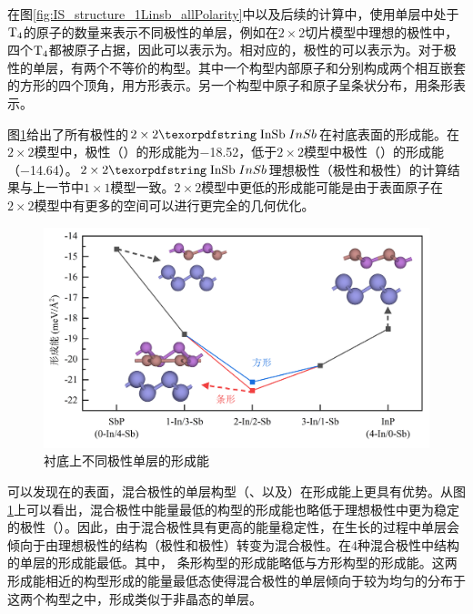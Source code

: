 在图\ref{fig:IS_structure_1Linsb_allPolarity}中以及后续的计算中，使用单层中处于$\rm T_{4} \it$的原子的数量来表示不同极性的单层，例如在$2 \times 2$切片模型中理想的极性中，四个$\rm T_{4} \it$都被原子占据，因此可以表示为。相对应的，极性的可以表示为。对于极性的单层，有两个不等价的构型。其中一个构型内部原子和分别构成两个相互嵌套的方形的四个顶角，用方形表示。另一个构型中原子和原子呈条状分布，用条形表示。

图\ref{fig:IS_DFT_1LInSb_all}给出了所有极性的$2 \times 2 \cemb{InSb}$在衬底表面的形成能。在$2 \times 2$模型中，极性（）的形成能为\SI{-18.52}{\mievpas}，低于$2 \times 2$模型中极性（）的形成能（\SI{-14.64}{\mievpas}）。$2 \times 2 \cemb{InSb}$理想极性（极性和极性）的计算结果与上一节中$1 \times 1$模型一致。$2 \times 2$模型中更低的形成能可能是由于表面原子在$2 \times 2$模型中有更多的空间可以进行更完全的几何优化。

\begin{figure}[!b]
    \includegraphics{pic/IS_DFT_1LInSb_all.png}
    \caption{衬底上不同极性单层的形成能}
    \label{fig:IS_DFT_1LInSb_all}
\end{figure}

可以发现在的表面，混合极性的单层构型（、以及）在形成能上更具有优势。从图\ref{fig:IS_DFT_1LInSb_all}上可以看出，混合极性中能量最低的构型的形成能也略低于理想极性中更为稳定的极性（）。因此，由于混合极性具有更高的能量稳定性，在生长的过程中单层会倾向于由理想极性的结构（极性和极性）转变为混合极性。在4种混合极性中结构的单层的形成能最低。其中， 条形构型的形成能略低与方形构型的形成能。这两形成能相近的构型形成的能量最低态使得混合极性的单层倾向于较为均匀的分布于这两个构型之中，形成类似于非晶态的单层。


